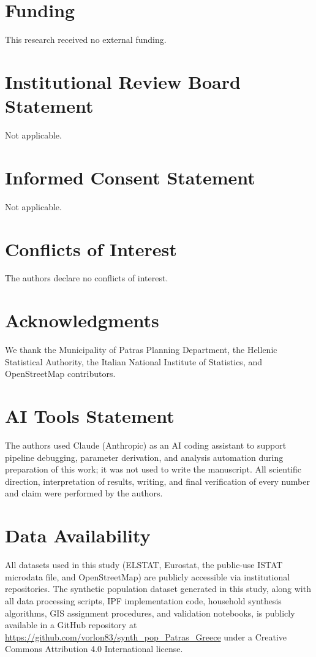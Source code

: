 \documentclass{article}
\begin{document}
\section*{Funding}
This research received no external funding.

\section*{Institutional Review Board Statement}
Not applicable.

\section*{Informed Consent Statement}
Not applicable.

\section*{Conflicts of Interest}
The authors declare no conflicts of interest.

\section*{Acknowledgments}\label{acknowledgments}

We thank the Municipality of Patras Planning Department, the Hellenic Statistical Authority, the Italian National Institute of Statistics, and OpenStreetMap contributors.

\section*{AI Tools Statement}
The authors used Claude (Anthropic) as an AI coding assistant to support pipeline debugging, parameter derivation, and analysis automation during preparation of this work; it was not used to write the manuscript. All scientific direction, interpretation of results, writing, and final verification of every number and claim were performed by the authors.

\section*{Data Availability}
All datasets used in this study (ELSTAT, Eurostat, the public-use ISTAT microdata file, and OpenStreetMap) are publicly accessible via institutional repositories. The synthetic population dataset generated in this study, along with all data processing scripts, IPF implementation code, household synthesis algorithms, GIS assignment procedures, and validation notebooks, is publicly available in a GitHub repository at \url{https://github.com/vorlon83/synth_pop_Patras_Greece} under a Creative Commons Attribution 4.0 International license.
\end{document}
